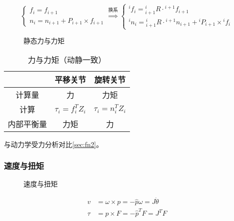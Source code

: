 \documentclass[
12pt, %
a4paper, 
oneside, %
headinclude,footinclude, %
]{scrartcl}
\begin{document}
$$
\begin{cases} f_i = f_{i + 1} \\ n_i = n_{i + 1} + P_{i + 1} \times f_{i + 1} \end{cases}
\overset{\text{换系}}{\Longrightarrow}
\begin{cases} {}^i f_i = {}^i_{i + 1}R \cdot {}^{i + 1} f_{i + 1} \\ {}^i n_i = {}^i_{i + 1}R \cdot {}^{i + 1} n_{i + 1} + {}^i P_{i + 1} \times {}^i f_i \end{cases}
$$
\noindent
\begin{minipage}{0.65\textwidth}
\begin{figure}[H]
\centering
{} \quad
{} \quad
{}
\caption{静态力与力矩}
\end{figure}
\end{minipage}
\begin{minipage}{0.35\textwidth}
\begin{table}[H]
\centering
\begin{tabular}{c|cc}
\hline
& 平移关节 & 旋转关节 \\
\hline
计算量 & 力 & 力矩 \\
计算 & $ \tau_i = f_i^T Z_i $ & $ \tau_i = n_i^T Z_i $ \\
内部平衡量 & 力矩 & 力 \\
\hline
\end{tabular}
\caption[力与力矩]{力与力矩（动静一致）}
\end{table}
\end{minipage}

与动力学受力分析对比\ref{sec:fn2}。
\subsubsection[速度与扭矩]{速度与扭矩}
\noindent
\begin{minipage}{0.6\textwidth}
\begin{figure}[H]
\centering
\subfloat[角速度与线速度]{\texttt{[image: wv]}} \quad
\subfloat[力与扭矩]{\texttt{[image: ft]}}
\caption{速度与扭矩}
\end{figure}
\end{minipage}
\begin{minipage}{0.4\textwidth}
\begin{align*}
v &= \omega \times p = -\hat{p} \omega = J \dot{\theta} \\
\tau &= p \times F = -\hat{p}^T F = J^T F
\end{align*}
\end{minipage}
\end{document}
